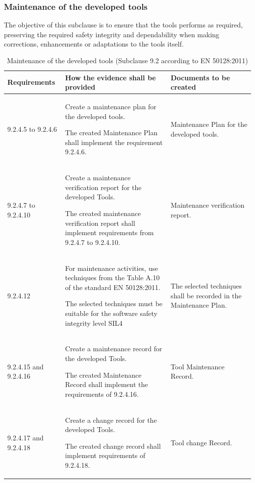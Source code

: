 \documentclass{template/openetcs_report}
\begin{document}
\subsubsection{Maintenance of the developed tools}
\begin{flushleft}
 The objective of this subclause is to ensure that the tools performs as required, preserving the required safety integrity and dependability when making corrections, enhancements or adaptations to the tools itself.
 \end{flushleft} 
{\footnotesize\sffamily\centering
\begin{longtable}{|p{2cm}|p{9cm}|p{3cm}|}
\caption{Maintenance of the developed tools (Subclause 9.2 according to EN 50128:2011)}\\
\hline
\bfseries Requirements & \bfseries How the evidence shall be provided & \bfseries Documents to be created\\
\hline
\hline
\endhead
\hline
\endfoot

9.2.4.5 to 9.2.4.6 & Create a maintenance plan for the developed tools.

The created Maintenance Plan shall implement the requirement 9.2.4.6.
& Maintenance Plan for the developed tools.\\ 
\hline
9.2.4.7 to 9.2.4.10 & Create a maintenance verification report for the developed Tools.

The created maintenance verification report shall implement requirements from 9.2.4.7 to 9.2.4.10.
& Maintenance verification report.\\ 
\hline
9.2.4.12 & For maintenance activities, use techniques from the Table A.10 of the standard EN 50128:2011.

The selected techniques must be suitable for the software safety integrity level SIL4 
& The selected techniques shall be recorded in the Maintenance Plan.\\ 
\hline
9.2.4.15 and 9.2.4.16 & Create a maintenance record for the developed Tools.

The created Maintenance Record shall implement the requirements of 9.2.4.16.
& Tool Maintenance Record.\\ 
\hline
9.2.4.17 and 9.2.4.18 & Create a change record for the developed Tools.

The created change record shall implement requirements of 9.2.4.18.
& Tool change Record.\\ 
\hline
\end{longtable}}
\end{document}
